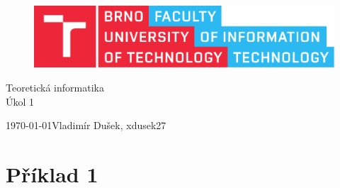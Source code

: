 \documentclass[11pt, a4paper, titlepage]{article}
\begin{document}
\begin{titlepage}
    \begin{center}
        \begin{figure}[htb]
            \centering
            \includegraphics[width=0.85\hsize]{images/fitlogo.pdf}
        \end{figure}
        {\Huge Teoretická informatika} \\
        \bigskip
        {\LARGE Úkol 1} \\
    \end{center}
    {\Large \today \hfill Vladimír Dušek, xdusek27}
\end{titlepage}





\section*{Příklad 1}
\end{document}
